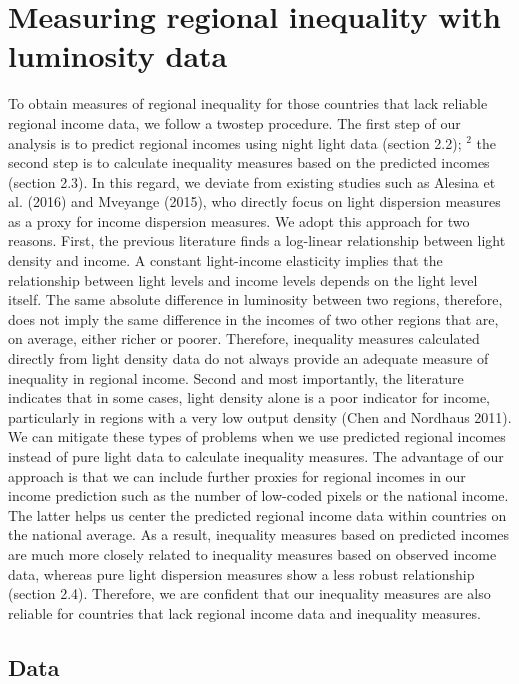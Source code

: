 \documentclass[10pt]{article}
\begin{document}
\section{Measuring regional inequality with luminosity data}

To obtain measures of regional inequality for those countries that lack reliable regional income data, we follow a twostep procedure. The first step of our analysis is to predict regional incomes using night light data (section 2.2); ${ }^{2}$ the second step is to calculate inequality measures based on the predicted incomes (section 2.3). In this regard, we deviate from existing studies such as Alesina et al. (2016) and Mveyange (2015), who directly focus on light dispersion measures as a proxy for income dispersion measures. We adopt this approach for two reasons. First, the previous literature finds a log-linear relationship between light density and income. A constant light-income elasticity implies that the relationship between light levels and income levels depends on the light level itself. The same absolute difference in luminosity between two regions, therefore, does not imply the same difference in the incomes of two other regions that are, on average, either richer or poorer. Therefore, inequality measures calculated directly from light density data do not always provide an adequate measure of inequality in regional income. Second and most importantly, the literature indicates that in some cases, light density alone is a poor indicator for income, particularly in regions with a very low output density (Chen and Nordhaus 2011). We can mitigate these types of problems when we use predicted regional incomes instead of pure light data to calculate inequality measures. The advantage of our approach is that we can include further proxies for regional incomes in our income prediction such as the number of low-coded pixels or the national income. The latter helps us center the predicted regional income data within countries on the national average. As a result, inequality measures based on predicted incomes are much more closely related to inequality measures based on observed income data, whereas pure light dispersion measures show a less robust relationship (section 2.4). Therefore, we are confident that our inequality measures are also reliable for countries that lack regional income data and inequality measures.

\subsection{Data}
\end{document}
